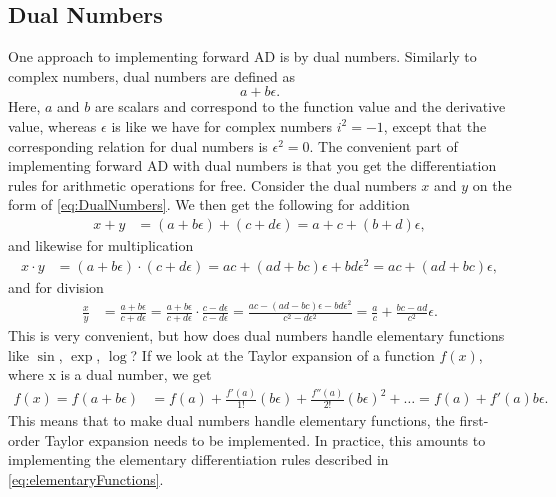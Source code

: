 \subsection{Dual Numbers}
\label{sec:DualNumbers}
One approach to implementing forward AD is by dual numbers. Similarly to complex numbers, dual numbers are defined as 
\begin{equation}
    a + b\epsilon.
    \label{eq:DualNumbers}
\end{equation}
Here, $a$ and $b$ are scalars and correspond to the function value and the derivative value, whereas $\epsilon$ is like we have for complex numbers $i^2 = -1$, except that the corresponding relation for dual numbers is $\epsilon^2 = 0$. The convenient part of implementing forward AD with dual numbers is that you get the differentiation rules for arithmetic operations for free. Consider the dual numbers $x$ and $y$ on the form of \eqref{eq:DualNumbers}. We then get the following for addition
\begin{align*}
x+y &= (a+b\epsilon)+(c+d\epsilon) = a+c+(b+d)\epsilon,
\end{align*}
and likewise for multiplication
\begin{align*}
x\cdot y &= (a+b\epsilon)\cdot(c+d\epsilon)%
    = ac + (ad + bc)\epsilon + bd\epsilon^2 %
    = ac + (ad + bc)\epsilon,
\end{align*}
and for division
\begin{align*}
\frac{x}{y} &= \frac{a+b\epsilon}{c+d\epsilon}%
    =\frac{a+b\epsilon}{c+d\epsilon} \cdot \frac{c-d\epsilon}{c-d\epsilon}%
    =\frac{ac-(ad-bc)\epsilon-bd\epsilon^2}{c^2-d\epsilon^2}%
    =\frac{a}{c} + \frac{bc-ad}{c^2}\epsilon.
\end{align*}
This is very convenient, but how does dual numbers handle elementary functions like $\sin$, $\exp$, $\log$? If we look at the Taylor expansion of a function $f(x)$, where x is a dual number, we get
\begin{align*}
    f(x) = f(a+b\epsilon) &= f(a) + \frac{f'(a)}{1!}(b\epsilon) + \frac{f''(a)}{2!}(b\epsilon)^2+\dots%
        =f(a) + f'(a)b\epsilon.
\end{align*}
This means that to make dual numbers handle elementary functions, the first-order Taylor expansion needs to be implemented. In practice, this amounts to implementing the elementary differentiation rules described in \eqref{eq:elementaryFunctions}. 

